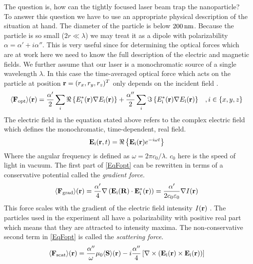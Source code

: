 The question is, how can the tightly focused laser beam trap the nanoparticle? To answer this question we have to use an appropriate physical description of the situation at hand. The diameter of the particle is below $200\nm$. Because the particle is so small ($2r\ll \lambda$) we may treat it as a dipole with polarizability $\alpha=\alpha'+i\alpha''$. This is very useful since for determining the optical forces which are at work here we need to know the full description of the electric and magnetic fields. We further assume that our laser is a monochromatic source of a single wavelength $\lambda$. In this case the time-averaged optical force which acts on the particle at position $\vc{r}=(r_x, r_y, r_z)^T$ only depends on the incident field \cite[p.~457]{novotny2012principles}.
\begin{equation}
	\av{\field{F}{opt}}(\vc{r})=\frac{\alpha'}{2}\sum\limits_{i}\Re\left\{\de{E}{i}^*(\vc{r})\nabla\de{E}{i}(\vc{r})\right\}+\frac{\alpha''}{2}\sum\limits_{i}\Im\left\{\de{E}{i}^*(\vc{r})\nabla\de{E}{i}(\vc{r})\right\}\;\;\;, i\in\{x,y,z\}
\end{equation}
The electric field in the equation stated above refers to the complex electric field which defines the monochromatic, time-dependent, real field.
\begin{equation}\label{EqFopt}
	\field{E}{i}(\vc{r},t)=\Re\left\{\field{E}{i}(\vc{r})e^{-i\omega t}\right\}
\end{equation}
Where the angular frequency is defined as $\omega=2\pi c_0/\lambda$. $c_0$ here is the speed of light in vacuum. The first part of \autoref{EqFopt} can be rewritten \cite[p.~457]{novotny2012principles} in terms of a conservative potential called the \textit{gradient force}.
\begin{equation}
	\av{\field{F}{grad}}(\vc{r})=\frac{\alpha'}{4}\nabla\left(\field{E}{i}(\vc{R})\cdot\field{E}{i}^*(\vc{r})\right)=\frac{\alpha'}{2c_0\varepsilon_0}\nabla I(\vc{r})
\end{equation} 
This force scales with the gradient of the electric field intensity $I(\vc{r})$ \cite[p.~17]{hebestreit2017thermal}. The particles used in the experiment all have a polarizability with positive real part which means that they are attracted to intensity maxima. The non-conservative second term in \autoref{EqFopt} is called the \textit{scattering force}.
\begin{equation}\label{EqScatteringForce}
	\av{\field{F}{scat}}(\vc{r})=\frac{\alpha''}\omega\mu_0\av{\vc{S}}(\vc{r})-i\frac{\alpha''}{4}\left[\nabla\times\left(\field{E}{i}(\vc{r})\times\field{E}{i}(\vc{r})\right)\right]
\end{equation}
